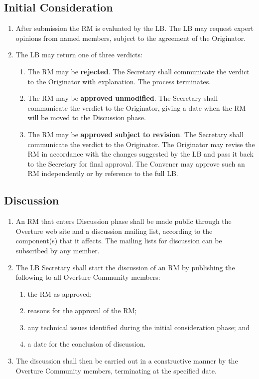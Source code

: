 \documentclass[]{article}
\begin{document}
\subsection{Initial Consideration}
\label{sec:initial}
\begin{enumerate}
\item After submission the RM is evaluated by the LB. The LB may
  request expert opinions from named members, subject to the agreement
  of the Originator.
\item The LB may return one of three verdicts: 
\begin{enumerate}
\item The RM may be \textbf{rejected}. The Secretary shall communicate the
  verdict to the Originator with explanation. The process terminates.
\item The RM may be \textbf{approved unmodified}. The Secretary
  shall communicate the verdict to the Originator, giving a date when the
  RM will be moved to the Discussion phase.
\item The RM may be \textbf{approved subject to revision}. The
  Secretary shall communicate the verdict to the Originator. The Originator
  may revise the RM in accordance with the changes suggested by the LB
  and pass it back to the Secretary for final approval. The Convener
  may approve such an RM independently or by reference to the full LB.
\end{enumerate}
\end{enumerate}

\subsection{Discussion} %
\label{sub:discussion_of_a_request_for_modification}
\begin{enumerate} 
\item An RM that enters Discussion phase shall be made public through the
  Overture web site and a discussion mailing list, according to the
  component(s) that it affects. The mailing lists for discussion can
  be subscribed by any member.
\item The LB Secretary shall start the discussion of an RM by
  publishing the following to all Overture Community members: 
\begin{enumerate}
\item the RM as approved;
\item reasons for the approval of the RM;
\item any technical issues identified during the initial consideration
  phase; and
\item a date for the conclusion of discussion.
\end{enumerate}
\item The discussion shall then be carried out in a constructive
  manner by the Overture Community members, terminating at the
  specified date.
\end{enumerate}
\end{document}
